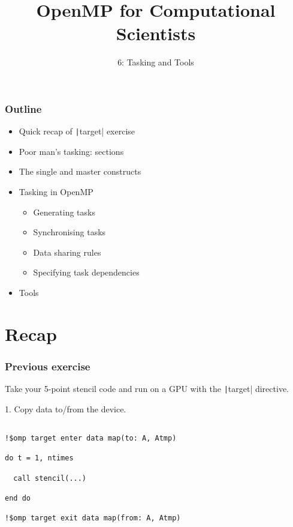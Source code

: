 \documentclass{beamer}
\title{OpenMP for Computational Scientists}
\subtitle{6: Tasking and Tools}
\begin{document}
\frame{\titlepage}

\begin{frame}
\frametitle{Outline}

\begin{itemize}
  \item Quick recap of \texttt|target| exercise
\end{itemize}

\begin{itemize}
  \item Poor man's tasking: sections
  \item The single and master constructs
  \item Tasking in OpenMP
  \begin{itemize}
    \item Generating tasks
    \item Synchronising tasks
    \item Data sharing rules
    \item Specifying task dependencies
  \end{itemize}

  \item Tools
\end{itemize}
\end{frame}

\section{Recap}
\begin{frame}[fragile]
\frametitle{Previous exercise}

Take your 5-point stencil code and run on a GPU with the \texttt|target| directive.

1. Copy data to/from the device.
\begin{verbatim}

!$omp target enter data map(to: A, Atmp)

do t = 1, ntimes

  call stencil(...)

end do

!$omp target exit data map(from: A, Atmp)
\end{verbatim}

\end{frame}
\end{document}

